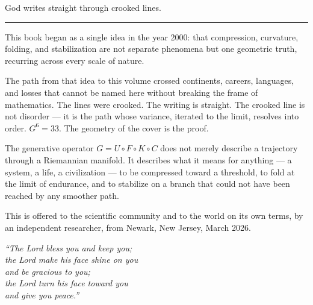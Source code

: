\documentclass[12pt, oneside]{book}
\theoremstyle{plain}
\theoremstyle{definition}
\theoremstyle{remark}
\begin{document}
\begin{center}
{\normalsize God writes straight through crooked lines.}
\end{center}

\vspace{0.5cm}

\begin{center}
\rule{0.4\textwidth}{0.2pt}
\end{center}

\vspace{0.5cm}

\noindent This book began as a single idea in the year 2000: that compression,
curvature, folding, and stabilization are not separate phenomena
but one geometric truth, recurring across every scale of nature.

\vspace{0.3cm}

\noindent The path from that idea to this volume crossed continents, careers,
languages, and losses that cannot be named here without breaking
the frame of mathematics. The lines were crooked. The writing is straight.
The crooked line is not disorder --- it is the path whose variance,
iterated to the limit, resolves into order.
$G^6 = 33$. The geometry of the cover is the proof.

\vspace{0.3cm}

\noindent The generative operator $G = U \circ F \circ K \circ C$ does not merely
describe a trajectory through a Riemannian manifold. It describes
what it means for anything --- a system, a life, a civilization ---
to be compressed toward a threshold, to fold at the limit of
endurance, and to stabilize on a branch that could not have been
reached by any smoother path.

\vspace{0.3cm}

\noindent This is offered to the scientific community and to the world
on its own terms, by an independent researcher,
from Newark, New Jersey, March 2026.

\vspace{0.8cm}


\vspace{0.5cm}

\begin{center}
{\small\itshape
``The Lord bless you and keep you;\\[0.2em]
the Lord make his face shine on you\\[0.2em]
and be gracious to you;\\[0.2em]
the Lord turn his face toward you\\[0.2em]
and give you peace.''\\[0.4em]
}
\end{center}
\end{document}
